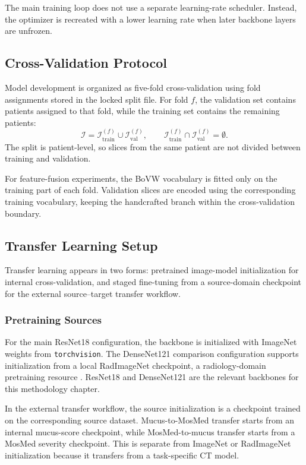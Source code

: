 The main training loop does not use a separate learning-rate scheduler. Instead, the optimizer is recreated with a lower learning rate when later backbone layers are unfrozen.

\subsection{Cross-Validation Protocol}
\label{sec:cross_validation_protocol}
Model development is organized as five-fold cross-validation using fold assignments stored in the locked split file. For fold \(f\), the validation set contains patients assigned to that fold, while the training set contains the remaining patients:
\begin{equation}
\mathcal{I}
=
\mathcal{I}_{\mathrm{train}}^{(f)}
\cup
\mathcal{I}_{\mathrm{val}}^{(f)},
\qquad
\mathcal{I}_{\mathrm{train}}^{(f)}
\cap
\mathcal{I}_{\mathrm{val}}^{(f)}
=
\emptyset .
\label{eq:method_cv_split}
\end{equation}
The split is patient-level, so slices from the same patient are not divided between training and validation.

For feature-fusion experiments, the BoVW vocabulary is fitted only on the training part of each fold. Validation slices are encoded using the corresponding training vocabulary, keeping the handcrafted branch within the cross-validation boundary.


\subsection{Transfer Learning Setup}
\label{sec:method_transfer_learning_setup}
Transfer learning appears in two forms: pretrained image-model initialization for internal cross-validation, and staged fine-tuning from a source-domain checkpoint for the external source--target transfer workflow.


\subsubsection{Pretraining Sources}
\label{sec:pretraining_sources}
For the main ResNet18 configuration, the backbone is initialized with ImageNet weights from \texttt{torchvision}. The DenseNet121 comparison configuration supports initialization from a local RadImageNet checkpoint, a radiology-domain pretraining resource \cite{mei2022radimagenet}. ResNet18 and DenseNet121 are the relevant backbones for this methodology chapter.

In the external transfer workflow, the source initialization is a checkpoint trained on the corresponding source dataset. Mucus-to-MosMed transfer starts from an internal mucus-score checkpoint, while MosMed-to-mucus transfer starts from a MosMed severity checkpoint. This is separate from ImageNet or RadImageNet initialization because it transfers from a task-specific CT model.


